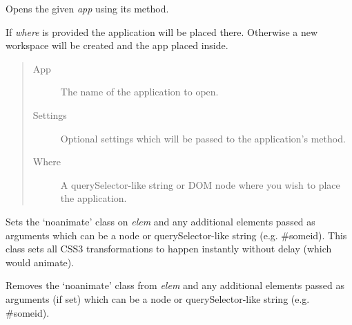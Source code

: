 \documentclass[letterpaper,10pt,openany]{sphinxmanual}
\begin{document}
\begin{fulllineitems}
\label{Developer/js_gateone:GateOne.openApplication}
Opens the given \emph{app} using its  method.

If \emph{where} is provided the application will be placed there.  Otherwise a new workspace will be created and the app placed inside.
\begin{quote}\begin{description}
\item[{App}] \leavevmode
The name of the application to open.

\item[{Settings}] \leavevmode
Optional settings which will be passed to the application's  method.

\item[{Where}] \leavevmode
A querySelector-like string or DOM node where you wish to place the application.

\end{description}\end{quote}

\end{fulllineitems}


\begin{fulllineitems}
\label{Developer/js_gateone:GateOne.Visual.disableTransitions}
Sets the `noanimate' class on \emph{elem} and any additional elements passed as arguments which can be a node or querySelector-like string (e.g. \#someid).  This class sets all CSS3 transformations to happen instantly without delay (which would animate).

\end{fulllineitems}


\begin{fulllineitems}
\label{Developer/js_gateone:GateOne.Visual.enableTransitions}
Removes the `noanimate' class from \emph{elem} and any additional elements passed as arguments (if set) which can be a node or querySelector-like string (e.g. \#someid).

\end{fulllineitems}
\end{document}
